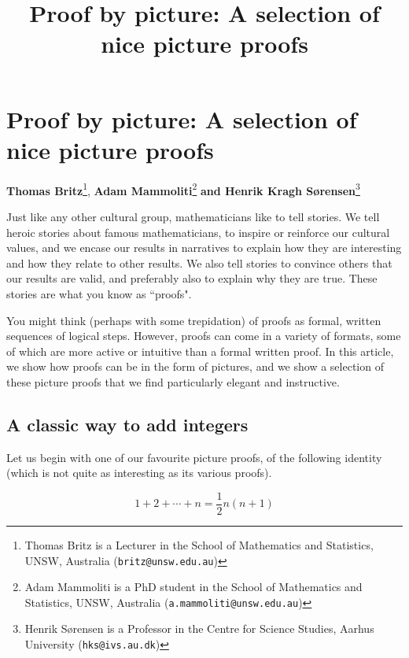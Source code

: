 \section*{Proof by picture: A selection of nice picture proofs}
\vspace{-.30cm}
\label{Britz}


\title{Proof by picture: A selection of nice picture proofs}


\begin{center}
\textbf{Thomas Britz}\footnote{%
Thomas Britz is a Lecturer in the School of Mathematics and Statistics, UNSW, Australia ({\tt britz@unsw.edu.au})},
\textbf{Adam Mammoliti}\footnote{%
Adam Mammoliti is a PhD student in the School of Mathematics and Statistics, UNSW, Australia ({\tt a.mammoliti@unsw.edu.au})}
\textbf{and Henrik Kragh S{\o}rensen}\footnote{%
Henrik S{\o}rensen is a Professor in the Centre for Science Studies, Aarhus University ({\tt hks@ivs.au.dk})}
\end{center}

\vspace{5mm}

Just like any other cultural group, mathematicians like to tell stories.
We tell heroic stories about famous mathematicians,
to inspire or reinforce our cultural values,
and we encase our results in narratives to explain how they
are interesting and how they relate to other results.
We also tell stories to convince others that our results are valid,
and preferably also to explain why they are true.
These stories are what you know as ``proofs".

You might think (perhaps with some trepidation) of proofs as formal,
written sequences of logical steps.
However, proofs can come in a variety of formats,
some of which are more active or intuitive than a formal written proof.
In this article, we show how proofs can be in the form of pictures,
and we show a selection of these picture proofs
that we find particularly elegant and instructive.

\medskip

\subsection*{A classic way to add integers}
\noindent
Let us begin with one of our favourite picture proofs,
of the following identity (which is not quite as interesting as its various proofs).
\begin{theorem}
\label{thm:integer_sum}
\[
  1 + 2 + \cdots + n = \frac{1}{2}n(n+1)
\]
\end{theorem}

